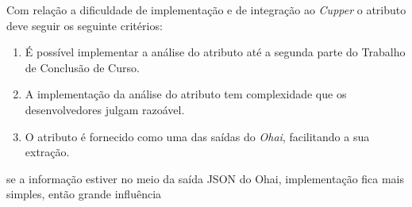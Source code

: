 Com relação a dificuldade de implementação e de integração ao \textit{Cupper} o
atributo deve seguir os seguinte critérios:

\begin{enumerate}
\item É possível implementar a análise do atributo até a segunda parte do
Trabalho de Conclusão de Curso.
\item A implementação da análise do atributo tem complexidade que os
desenvolvedores julgam razoável.
\item O atributo é fornecido como uma das saídas do \textit{Ohai}, facilitando
a sua extração.
\end{enumerate}


{\color{red} se a informação estiver no meio da saída JSON do Ohai, implementação fica mais
simples, então grande influência}


